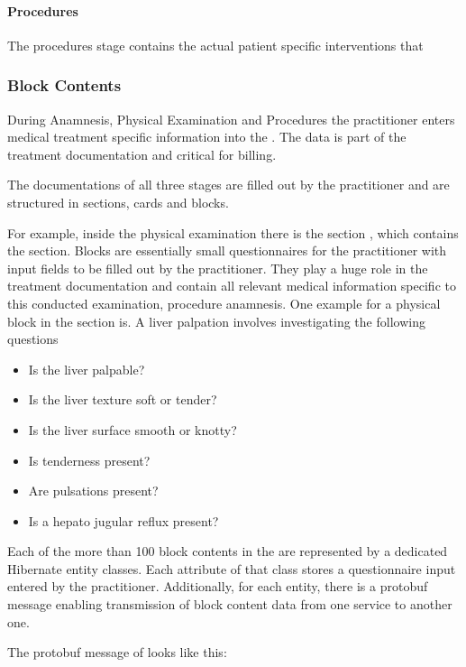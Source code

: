 \paragraph{Procedures}
The procedures stage contains the actual patient specific interventions that \todo

\subsubsection{Block Contents}
During Anamnesis,
Physical Examination and Procedures the practitioner enters medical treatment specific information into the \AVS.
The data is part of the treatment documentation and critical for billing.

The documentations of all three stages are filled out by the practitioner and are structured in sections,
cards and blocks.

For example, inside the physical examination there is the section ,
which contains the section.
Blocks are essentially small questionnaires for the practitioner with input fields to be filled out by the practitioner.
They play a huge role in the treatment documentation
and contain all relevant medical information specific to this conducted examination,
procedure anamnesis.
One example for a physical block in the section is.
A liver palpation involves investigating the following questions

\begin{itemize}
    \item Is the liver palpable?
    \item Is the liver texture soft or tender?
    \item Is the liver surface smooth or knotty?
    \item Is tenderness present?
    \item Are pulsations present?
    \item Is a hepato jugular reflux present?
\end{itemize}

Each of the more than 100 block contents in the \AVS are represented by a dedicated Hibernate entity classes.
Each attribute of that class stores a questionnaire input entered by the practitioner.
Additionally, for each entity, there is a protobuf message enabling transmission of block content data from one service
to another one.

The protobuf message of  looks like this:


